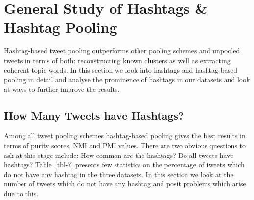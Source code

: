 \documentclass{sig-alternate}
\begin{document}
%

%


%
%

%


%
%

\section*{General Study of Hashtags \& Hashtag Pooling}

\label{sec:hashtag_pooling}

Hashtag-based tweet pooling outperforms other pooling schemes and
unpooled tweets in terms of both: reconstructing known clusters as
well as extracting coherent topic words. In this section we look into
hashtags and hashtag-based pooling in detail and analyse the
prominence of hashtags in our datasets and look at ways to further
improve the results.

\subsection*{How Many Tweets have Hashtags?}

Among all tweet pooling schemes hashtag-based pooling gives the best
results in terms of purity scores, NMI and PMI values. There are two
obvious questions to ask at this stage include: How common are the
hashtags? Do all tweets have hashtags? Table~\ref{tbl-7} presents few
statistics on the percentage of tweets which do not have any hashtag
in the three datasets. In this section we look at the number of tweets which do not have any hashtag and posit problems which arise due to this.
\end{document}
